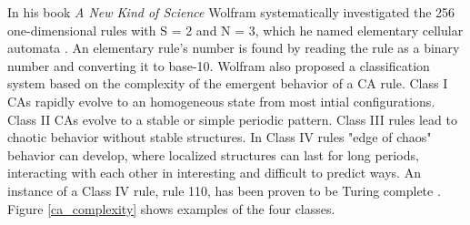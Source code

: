\documentclass{facconf}
\begin{document}
\begin{multicols}{2}
\par In his book \textit{A New Kind of Science} Wolfram systematically 
investigated the 256 one-dimensional rules with S = 2 and N = 3, which he named 
elementary cellular automata \cite{wolfram2002new}. An elementary rule's number 
is found by reading the rule as a binary number and converting it to base-10.  
Wolfram also proposed a classification system based on the complexity of the 
emergent behavior of a CA rule. Class I CAs rapidly evolve to an homogeneous 
state from most  intial configurations.  Class II CAs evolve to a stable or 
simple periodic pattern.  Class III rules lead to chaotic behavior without 
stable structures.  In Class IV rules "edge of chaos" behavior can develop, 
       where localized structures can last for long periods, interacting with 
       each other in interesting and difficult to predict ways. An instance of 
       a Class IV rule, rule 110, has been proven to be Turing complete 
       \cite{cook2004universality}. Figure \ref{ca_complexity} shows examples 
       of the four classes.  \par


\end{multicols}
\end{document}
